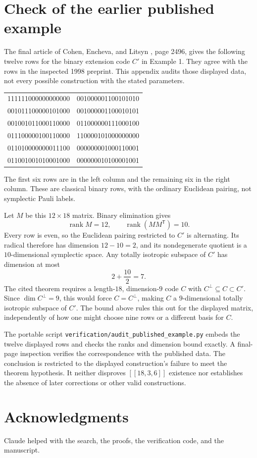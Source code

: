 \documentclass[11pt,a4paper]{article}
\newcommand{\rank}{\operatorname{rank}}
\begin{document}
\section{Check of the earlier published example}\label{app:prior}
The final article of Cohen, Encheva, and Litsyn \cite{CohenEnchevaLitsyn1999}, page 2496, gives the following twelve rows for the binary extension code $C'$ in Example 1. They agree with the rows in the inspected 1998 preprint. This appendix audits those displayed data, not every possible construction with the stated parameters.
\begin{center}\small\ttfamily
\begin{tabular}{@{}ll@{}}
111111000000000000 & 001000001100101010\\
001011100000101000 & 001000001100010101\\
001001011000110000 & 011000000111000100\\
011100000100110000 & 110000101000000000\\
011010000000011100 & 000000001000110001\\
011001001010001000 & 000000010100001001
\end{tabular}
\end{center}
The first six rows are in the left column and the remaining six in the right column. These are classical binary rows, with the ordinary Euclidean pairing, not symplectic Pauli labels.

Let $M$ be this $12\times18$ matrix. Binary elimination gives
\[
 \rank M=12,\qquad \rank(MM^{\mathsf T})=10.
\]
Every row is even, so the Euclidean pairing restricted to $C'$ is alternating. Its radical therefore has dimension $12-10=2$, and its nondegenerate quotient is a $10$-dimensional symplectic space. Any totally isotropic subspace of $C'$ has dimension at most
\[
 2+\frac{10}{2}=7.
\]
The cited theorem requires a length-$18$, dimension-$9$ code $C$ with $C^\perp\subseteq C\subset C'$. Since $\dim C^\perp=9$, this would force $C=C^\perp$, making $C$ a $9$-dimensional totally isotropic subspace of $C'$. The bound above rules this out for the displayed matrix, independently of how one might choose nine rows or a different basis for $C$.

The portable script \texttt{verification/audit\_published\_example.py} embeds the twelve displayed rows and checks the ranks and dimension bound exactly. A final-page inspection verifies the correspondence with the published data. The conclusion is restricted to the displayed construction's failure to meet the theorem hypothesis. It neither disproves $[[18,3,6]]$ existence nor establishes the absence of later corrections or other valid constructions.

\section*{Acknowledgments}
Claude helped with the search, the proofs, the verification code, and the
manuscript.



\end{document}
